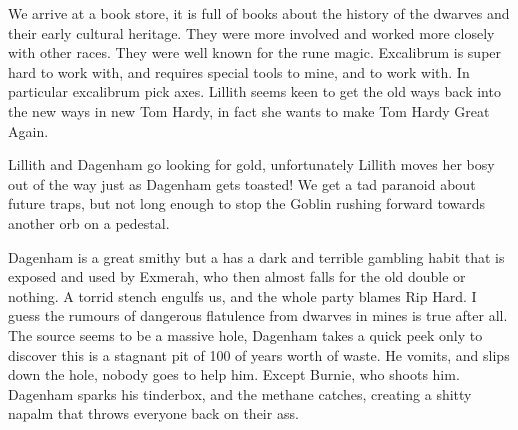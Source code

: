 We arrive at a book store, it is full of books about the history of the dwarves and their early cultural heritage. They were more involved and worked more closely with other races. They were well known for the rune magic. Excalibrum is super hard to work with, and requires special tools to mine, and to work with. In particular excalibrum pick axes. Lillith seems keen to get the old ways back into the new ways in new Tom Hardy, in fact she wants to make Tom Hardy Great Again.\medskip

Lillith and Dagenham go looking for gold, unfortunately Lillith moves her bosy out of the way just as Dagenham gets toasted! We get a tad paranoid about future traps, but not long enough to stop the Goblin rushing forward towards another orb on a pedestal.\medskip

Dagenham is a great smithy but a has a dark and terrible gambling habit that is exposed and used by Exmerah, who then almost falls for the old double or nothing. A torrid stench engulfs us, and the whole party blames Rip Hard. I guess the rumours of dangerous flatulence from dwarves in mines is true after all. The source seems to be a massive hole, Dagenham takes a quick peek only to discover this is a stagnant pit of 100 of years worth of waste. He vomits, and slips down the hole, nobody goes to help him. Except Burnie, who shoots him. Dagenham sparks his tinderbox, and the methane catches, creating a shitty napalm that throws everyone back on their ass.\medskip

\vspace*{5mm}

